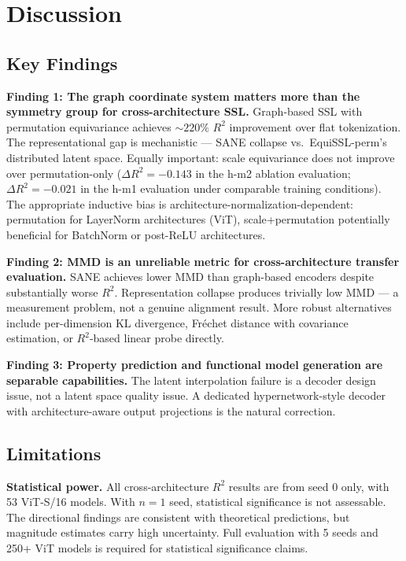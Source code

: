 \section{Discussion}
\label{sec:discussion}

\subsection*{Key Findings}

\textbf{Finding 1: The graph coordinate system matters more than the symmetry group
for cross-architecture SSL.}
Graph-based SSL with permutation equivariance achieves ${\sim}220\%$ $R^2$ improvement over
flat tokenization.
The representational gap is mechanistic ---
SANE collapse vs.\ EquiSSL-perm's distributed latent space.
Equally important: scale equivariance does not improve over permutation-only
($\Delta R^2 = -0.143$ in the h-m2 ablation evaluation;
$\Delta R^2 = -0.021$ in the h-m1 evaluation under comparable training conditions).
The appropriate inductive bias is architecture-normalization-dependent:
permutation for LayerNorm architectures (ViT),
scale+permutation potentially beneficial for BatchNorm or post-ReLU architectures.

\textbf{Finding 2: MMD is an unreliable metric for cross-architecture transfer evaluation.}
SANE achieves lower MMD than graph-based encoders despite substantially worse $R^2$.
Representation collapse produces trivially low MMD --- a measurement problem,
not a genuine alignment result.
More robust alternatives include per-dimension KL divergence, Fr\'{e}chet distance with
covariance estimation, or $R^2$-based linear probe directly.

\textbf{Finding 3: Property prediction and functional model generation are separable
capabilities.}
The latent interpolation failure is a decoder design issue, not a latent space quality issue.
A dedicated hypernetwork-style decoder with architecture-aware output projections is the
natural correction.

\subsection*{Limitations}

\textbf{Statistical power.}
All cross-architecture $R^2$ results are from seed 0 only, with 53 ViT-S/16 models.
With $n = 1$ seed, statistical significance is not assessable.
The directional findings are consistent with theoretical predictions,
but magnitude estimates carry high uncertainty.
Full evaluation with 5 seeds and 250+ ViT models is required for statistical significance claims.

